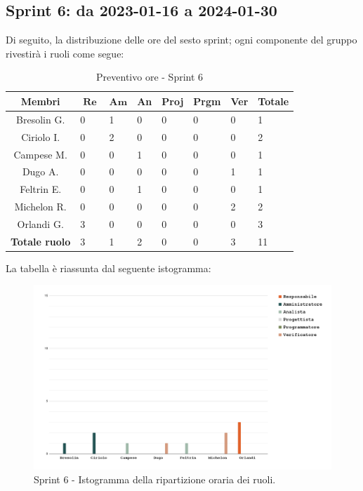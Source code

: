 \documentclass[10pt, a4paper]{article}
\begin{document}
\subsection{Sprint 6: da 2023-01-16 a 2024-01-30}
Di seguito, la distribuzione delle ore del sesto sprint; ogni componente del gruppo rivestirà i ruoli come segue:
\begin{table}[H]
\begin{tabularx}{\textwidth}{c|X|X|X|X|X|X|X}
        \textbf{Membri} & $\operatorname{\textbf{Re}}$ & $\mathrm{\textbf{Am}}$ & \textbf{An} & \textbf{Proj} & \textbf{Prgm} & \textbf{Ver} & \textbf{Totale} \\
        \hline Bresolin G. & 0 & \cellcolor{primarycolor}1 & 0 & 0 & 0 & 0 & 1 \\
        \hline Ciriolo I.  & 0 & \cellcolor{primarycolor}2 & 0 & 0 & 0 & 0 & 2 \\
        \hline Campese M.  & 0 & 0 & \cellcolor{primarycolor}1 & 0 & 0 & 0 & 1 \\
        \hline Dugo A.     & 0 & 0 & 0 & 0 & 0 & \cellcolor{primarycolor}1 & 1 \\
        \hline Feltrin E.  & 0 & 0 & \cellcolor{primarycolor}1 & 0 & 0 & 0 & 1 \\
        \hline Michelon R. & 0 & 0 & 0 & 0 & 0 & \cellcolor{primarycolor}2 & 2 \\
        \hline Orlandi G.  & \cellcolor{primarycolor}3 & 0 & 0 & 0 & 0 & 0 & 3 \\
        \hline
        \textbf{Totale ruolo} & 3 & 1 & 2 & 0 & 0 & 3 & 11
    \end{tabularx}
    \caption{Preventivo ore - Sprint 6}
    \end{table}

La tabella è riassunta dal seguente istogramma:
 \begin{figure}[H]
        \centering        
        \includegraphics[width=15.5cm]{istogrammi/istogramma_6_periodo.png}
        \caption{Sprint 6 - Istogramma della ripartizione oraria dei ruoli. }
    \end{figure}
\end{document}
